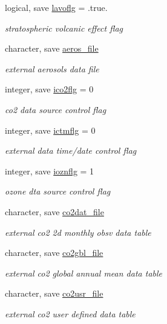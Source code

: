 \begin{DoxyCompactItemize}
logical, save \hyperlink{namespacephysparam_a70a2b7af2c7f6f631ef05cb05ba6eb8c}{lavoflg} = .true.
\begin{DoxyCompactList}\small\item\em stratospheric volcanic effect flag \end{DoxyCompactList}\item 
character, save \hyperlink{namespacephysparam_a21ceb784a896e6e88dc552786b1c4232}{aeros\+\_\+file}
\begin{DoxyCompactList}\small\item\em external aerosols data file \end{DoxyCompactList}\item 
integer, save \hyperlink{namespacephysparam_a61baf693e83ac6144d86fb8213d39a79}{ico2flg} = 0
\begin{DoxyCompactList}\small\item\em co2 data source control flag \end{DoxyCompactList}\item 
integer, save \hyperlink{namespacephysparam_a4eef5ac5e5b83526d5da7de493cfe73d}{ictmflg} = 0
\begin{DoxyCompactList}\small\item\em external data time/date control flag \end{DoxyCompactList}\item 
integer, save \hyperlink{namespacephysparam_a90d63a1a0c04479f586ce21df72d36b7}{ioznflg} = 1
\begin{DoxyCompactList}\small\item\em ozone dta source control flag \end{DoxyCompactList}\item 
character, save \hyperlink{namespacephysparam_abed249e396bbc5c096408db58b5104c0}{co2dat\+\_\+file}
\begin{DoxyCompactList}\small\item\em external co2 2d monthly obsv data table \end{DoxyCompactList}\item 
character, save \hyperlink{namespacephysparam_ad3e0f053cd067945bdc816b1a81a859a}{co2gbl\+\_\+file}
\begin{DoxyCompactList}\small\item\em external co2 global annual mean data table \end{DoxyCompactList}\item 
character, save \hyperlink{namespacephysparam_a2af9769060fccf9c42e14a30cf21c0aa}{co2usr\+\_\+file}
\begin{DoxyCompactList}\small\item\em external co2 user defined data table \end{DoxyCompactList}\item 

\end{DoxyCompactItemize}
